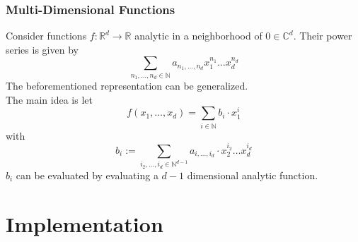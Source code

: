 \documentclass[xcolor=pdftex,dvipsnames,table,handout]{beamer}
\newcommand{\N}{\ensuremath{\mathbb{N}}}
\newcommand{\RR}{\ensuremath{\mathbb{R}}}
\newcommand{\C}{\ensuremath{\mathbb{C}}}
\newcommand{\abs}[1]{\left|#1\right|}
\begin{document}
\begin{frame}
  \frametitle{Multi-Dimensional Functions}
  Consider functions $f: \RR^d \to \RR$ analytic in a neighborhood of $0 \in \C^d$.
  \pause
  Their power series is given by
  $$\sum_{n_1, \dots, n_d \in \N} a_{n_1,\dots,n_d}x_1^{ n_1 } \dots x_d^{ n_d }$$
  \pause
  The beforementioned representation can be generalized.\\
  The main idea is let
  $$f(x_1, \dots, x_d) = \sum_{i \in \N} b_i\cdot x_1^i$$
  with
  $$b_{i} := \sum_{i_2, \dots, i_d \in \N^{d-1}} a_{i, \dots, i_d} \cdot x_2^{i_2} \dots x_d^{i_d}$$
  \pause
  $b_i$ can be evaluated by evaluating a $d-1$ dimensional analytic function.
  \end{frame}
\section{Implementation}
\end{document}
